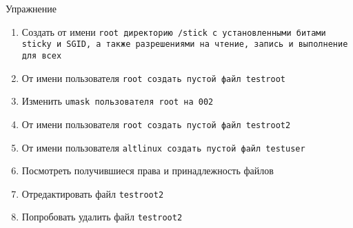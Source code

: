 \begin{frame}
	\begin{block}{Упражнение}
		\begin{enumerate}
			\item Создать от имени \tt{root} директорию \tt{/stick} с установленными битами \tt{sticky} и \tt{SGID}, а также разрешениями на чтение, запись и выполнение для всех
			\item От имени пользователя \tt{root} создать пустой файл \tt{testroot}
			\item Изменить \tt{umask} пользователя \tt{root} на 002
			\item От имени пользователя \tt{root} создать пустой файл \tt{testroot2}
			\item От имени пользователя \tt{altlinux} создать пустой файл \tt{testuser}
			\item Посмотреть получившиеся права и принадлежность файлов
			\item Отредактировать файл \tt{testroot2}
			\item Попробовать удалить файл \tt{testroot2}
		\end{enumerate}
	\end{block}
\end{frame}



